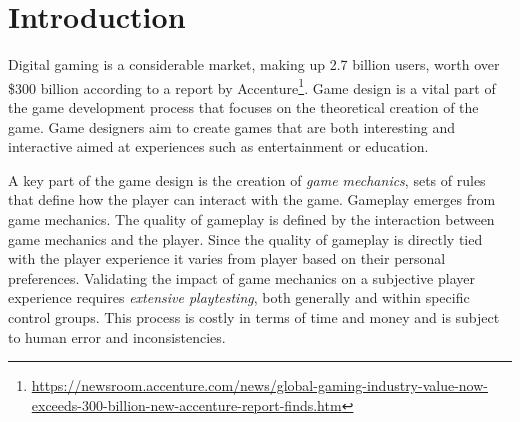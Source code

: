 \chapter{Introduction}
\label{ch:introduction}

Digital gaming is a considerable market, making up 2.7 billion users, worth over \$300 billion according to a report by Accenture\footnote{\url{https://newsroom.accenture.com/news/global-gaming-industry-value-now-exceeds-300-billion-new-accenture-report-finds.htm}}. Game design is a vital part of the game development process that focuses on the theoretical creation of the game. Game designers aim to create games that are both interesting and interactive aimed at experiences such as entertainment or education. 


A key part of the game design is the creation of \emph{game mechanics}, sets of rules that define how the player can interact with the game. Gameplay emerges from game mechanics\cite{adams2012game}. The quality of gameplay is defined by the interaction between game mechanics and the player. Since the quality of gameplay is directly tied with the player experience it varies from player based on their personal preferences. Validating the impact of game mechanics on a subjective player experience requires \emph{extensive playtesting}, both generally and within specific control groups. This process is costly in terms of time and money\cite{ostrowski2013automated} and is subject to human error and inconsistencies.




